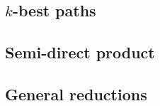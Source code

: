 \documentclass[10pt]{article}
\newcommand{\NN}{\mathbb{N}}
\newcommand{\BB}{\mathbb{B}}
\newcommand{\Id}{\mathrm{id}}
\newcommand{\SemCarrier}[1]{{\mathrm{Carrier}}({#1})}
\newcommand{\propname}[1]{{\mathbb{#1}}}
\begin{document}
\subsection{$k$-best paths}






\subsection{Semi-direct product}

\subsection{General reductions}


\end{document}
